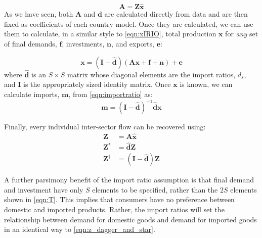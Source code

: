 \documentclass[a4paper]{article}
\begin{document}
\begin{equation}\label{eqn:a_combined}
    \boldsymbol{A} = \boldsymbol{Z} \boldsymbol{\hat{x}}
\end{equation}
As we have seen, both $\boldsymbol{A}$ and $\boldsymbol{d}$ are calculated directly from data and are then fixed as coefficients of each country model. Once they are calculated, we can use them to calculate, in a similar style to \cref{eqn:xIRIO}, total production $\boldsymbol{x}$ for \textit{any} set of final demands, $\boldsymbol{f}$, investments, $\boldsymbol{n}$, and exports, $\boldsymbol{e}$: 

\begin{equation}
    \boldsymbol{x} 
    = 
    (\boldsymbol{I} - \boldsymbol{\hat{d}})
    (
    \boldsymbol{Ax} + 
    \boldsymbol{f} + \boldsymbol{n}
    )
    + \boldsymbol{e}
    \label{eqn:xmodel}
\end{equation}
where $\boldsymbol{\hat{d}}$ is an $S \times S$ matrix whose diagonal elements are the import ratios, $d_s$, and $\boldsymbol{I}$ is the appropriately sized identity matrix.
Once $\boldsymbol{x}$ is known, we can calculate imports, $\boldsymbol{m}$, from \cref{eqn:importratio} as:
\begin{equation}
\boldsymbol{m} = 
(\boldsymbol{I} - 
\boldsymbol{\hat{d}})^{-1} 
\boldsymbol{\hat{d}}\boldsymbol{x}\label{eqn:mmodel}
\end{equation}

Finally, every individual inter-sector flow can be recovered using:
\begin{equation}\label{eqn:z_dagger_and_star}
    \begin{aligned}
        \boldsymbol{Z}& = \boldsymbol{A}\boldsymbol{\hat{x}} \\
        \boldsymbol{Z^*}& = \boldsymbol{\hat{d}}\boldsymbol{Z} \\
        \boldsymbol{Z^\dagger}& = (\boldsymbol{I} - \boldsymbol{\hat{d}}) \boldsymbol{Z}
    \end{aligned}
\end{equation}

A further parsimony benefit of the import ratio assumption is that final demand and investment have only $S$ elements to be specified, rather than the $2S$ elements shown in \cref{eqn:T}.
This implies that consumers have no preference between domestic and imported products.
Rather, the import ratios will set the relationship between demand for domestic goods and demand for imported goods in an identical way to \cref{eqn:z_dagger_and_star}.
\end{document}
